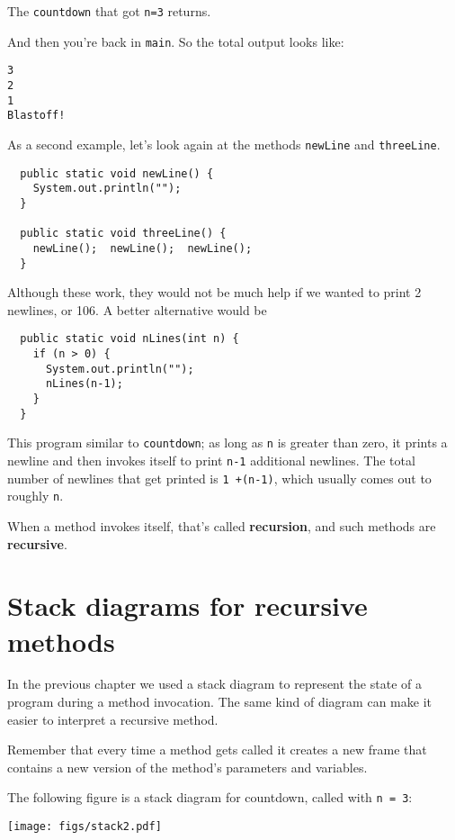 \documentclass[12pt]{book}
\theoremstyle{definition}
\begin{document}
The {\tt countdown} that got {\tt n=3} returns.

\noindent And then you're back in {\tt main}.  So the
total output looks like:

\begin{lstlisting}
3
2
1
Blastoff!
\end{lstlisting}
%
As a second example, let's look again at the methods
{\tt newLine} and {\tt threeLine}.

\begin{lstlisting}
  public static void newLine() {
    System.out.println("");
  }

  public static void threeLine() {
    newLine();  newLine();  newLine();
  }
\end{lstlisting}
%
Although these work, they would not be much help if we wanted
to print 2 newlines, or 106.  A better alternative would be

\begin{lstlisting}
  public static void nLines(int n) {
    if (n > 0) {
      System.out.println("");
      nLines(n-1);
    }
  }
\end{lstlisting}
%
This program similar to {\tt countdown}; as long as {\tt n} is greater
than zero, it prints a newline and then invokes itself to
print {\tt n-1} additional newlines.  The total number
of newlines that get printed is {\tt 1 +(n-1)}, which usually
comes out to roughly {\tt n}.


When a method invokes itself, that's called {\bf recursion}, and
such methods are {\bf recursive}.


\section{Stack diagrams for recursive methods}

In the previous chapter we used a stack diagram to represent the
state of a program during a method invocation.  The same kind
of diagram can make it easier to interpret a recursive method.

Remember that every time a method gets called it creates
a new frame that contains a new version of
the method's parameters and variables.

The following figure is a stack diagram for countdown, called
with {\tt n = 3}:

\texttt{[image: figs/stack2.pdf]}
\end{document}
